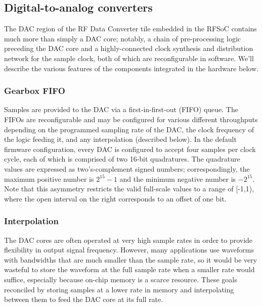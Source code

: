 \subsection{Digital-to-analog converters}

The DAC region of the RF Data Converter tile embedded in the RFSoC contains much more than simply a DAC core; notably, a chain of pre-processing logic preceding the DAC core and a highly-connected clock synthesis and distribution network for the sample clock, both of which are reconfigurable in software. We'll describe the various features of the components integrated in the hardware below. 

\subsubsection{Gearbox FIFO}

Samples are provided to the DAC via a first-in-first-out (FIFO) queue. The FIFOs are reconfigurable and may be configured for various different throughputs depending on the programmed sampling rate of the DAC, the clock frequency of the logic feeding it, and any interpolation (described below). In the default firmware configuration, every DAC is configured to accept four samples per clock cycle, each of which is comprised of two 16-bit quadratures. The quadrature values are expressed as two's-complement signed numbers; correspondingly, the maximum positive number is $2^{15} - 1$ and the minimum negative number is $-2^{15}$. Note that this asymmetry restricts the valid full-scale values to a range of [-1,1), where the open interval on the right corresponds to an offset of one bit.

\subsubsection{Interpolation}

The DAC cores are often operated at very high sample rates in order to provide flexibility in output signal frequency. However, many applications use waveforms with bandwidths that are much smaller than the sample rate, so it would be very wasteful to store the waveform at the full sample rate when a smaller rate would suffice, especially because on-chip memory is a scarce resource. These goals reconciled by storing samples at a lower rate in memory and interpolating between them to feed the DAC core at its full rate. 

